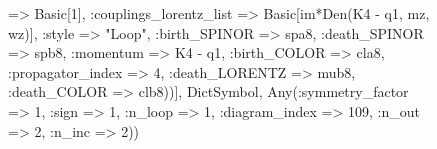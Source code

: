 \documentclass{revtex4}
\begin{document}
\begin{figure}[!htb]
\begin{center}
{=> Basic[1], :couplings_lorentz_list => Basic[im*Den(K4 - q1, mz, wz)], :style => "Loop", :birth_SPINOR => spa8, :death_SPINOR => spb8, :momentum => K4 - q1, :birth_COLOR => cla8, :propagator_index => 4, :death_LORENTZ => mub8, :death_COLOR => clb8))], Dict{Symbol, Any}(:symmetry_factor => 1, :sign => 1, :n_loop => 1, :diagram_index => 109, :n_out => 2, :n_inc => 2)) 
}
\end{center}
\end{figure}
\end{document}
